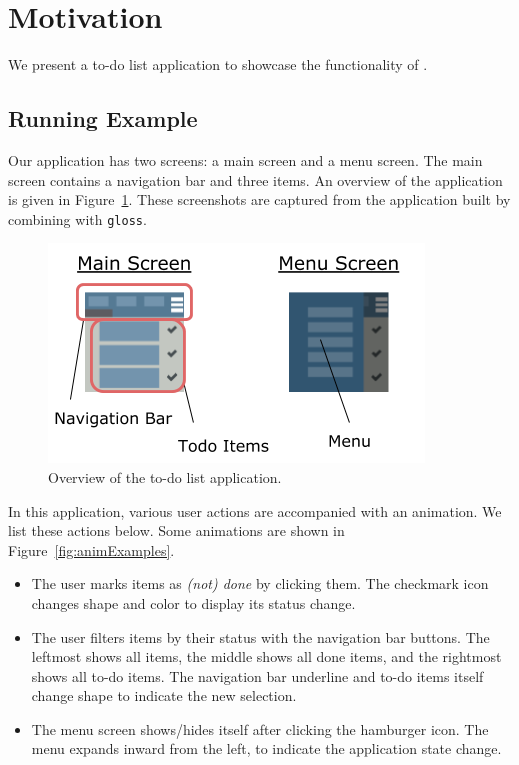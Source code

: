 \section{Motivation}
\label{sec:motivation}

We present a to-do list application to showcase the
functionality of \dsl{}.

\subsection{Running Example}

Our application has two screens: a main screen and a menu screen. The main screen contains a navigation bar and three items. An overview of the application is given in Figure~\ref{fig:appOverview}. These screenshots are captured from the application built by combining \dsl{} with \texttt{gloss}.

\begin{figure}[!htbp]
\centering
\includegraphics[width=\figscale\textwidth]{pictures/app_overview}
\caption{Overview of the to-do list application.}
\label{fig:appOverview}
\end{figure}

In this application, various user actions are accompanied with an animation.
We list these actions below. Some animations are shown in Figure~\ref{fig:animExamples}.
\begin{itemize}
\item The user marks items as \emph{(not) done} by clicking them. The
checkmark icon changes shape and color to display its status change.
\item The user filters items by their status with the navigation bar
buttons. The leftmost shows all items, the middle shows all done items, and
the rightmost shows all to-do items. The navigation bar underline and to-do
items itself change shape to indicate the new selection.
\item The menu screen shows/hides itself after clicking the hamburger icon. The
menu expands inward from the left, to indicate the application state change.
\end{itemize}

